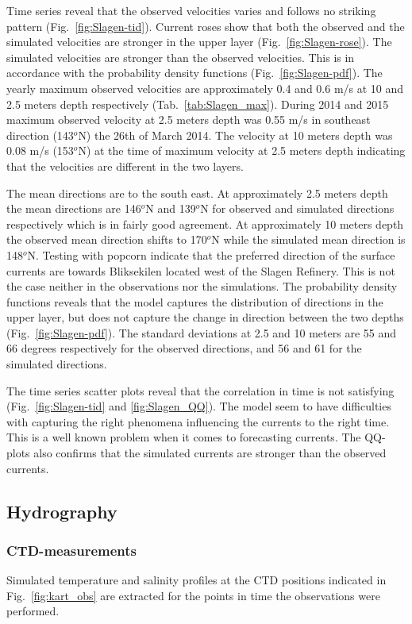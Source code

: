 Time series reveal that the observed velocities varies and follows no striking pattern (Fig.~\ref{fig:Slagen-tid}).
Current roses show that both the observed and the simulated velocities are stronger in the upper layer (Fig.~\ref{fig:Slagen-rose}). The simulated velocities are stronger than the observed velocities. This is in accordance with the probability density functions (Fig.~\ref{fig:Slagen-pdf}). The yearly maximum observed velocities are approximately 0.4 and 0.6 m/s at 10 and 2.5 meters depth respectively (Tab.~\ref{tab:Slagen_max}). During 2014 and 2015 maximum observed velocity at 2.5 meters depth was 0.55 m/s in southeast direction (143$^o$N) the 26th of March 2014. The velocity at 10 meters depth was 0.08 m/s (153$^o$N) at the time of maximum velocity at 2.5 meters depth indicating that the velocities are different in the two layers.

The mean directions are to the south east. At approximately 2.5 meters depth the mean directions are 146$^o$N and 139$^o$N for observed and simulated directions respectively which is in fairly good agreement. At approximately 10 meters depth the observed mean direction shifts to 170$^o$N while the simulated mean direction is 148$^o$N. 
Testing with popcorn indicate that the preferred direction of the surface currents are towards Bliksekilen located west of the Slagen Refinery. This is not the case neither in the observations nor the simulations.
The probability density functions reveals that the model captures the distribution of directions in the upper layer, but does not capture the change in direction between the two depths (Fig.~\ref{fig:Slagen-pdf}). The standard deviations at 2.5 and 10 meters are 55 and 66 degrees respectively for the observed directions, and 56 and 61 for the simulated directions.

The time series scatter plots reveal that the correlation in time is not satisfying (Fig.~\ref{fig:Slagen-tid} and \ref{fig:Slagen_QQ}). The model seem to have difficulties with capturing the right phenomena influencing the currents to the right time. This is a well known problem when it comes to forecasting currents. The QQ-plots also confirms that the simulated currents are stronger than the observed currents. 


\clearpage

\subsection{Hydrography}

\subsubsection{CTD-measurements}
Simulated temperature and salinity profiles at the CTD positions indicated in Fig.~\ref{fig:kart_obs} are extracted for the points in time the observations were performed. 


